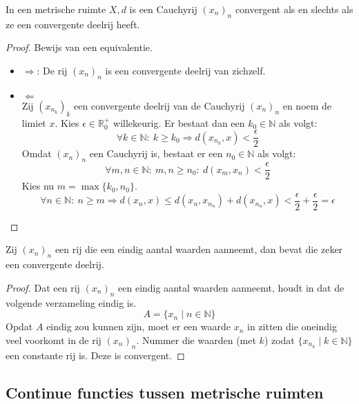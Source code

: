 \documentclass[main.tex]{subfiles}
\begin{document}
\begin{st}
  \label{st:cauchy-asa-convergente-deelrij}
  In een metrische ruimte $X,d$ is een Cauchyrij $(x_{n})_{n}$ convergent als en slechts als ze een convergente deelrij heeft. 

  \begin{proof}
    Bewijs van een equivalentie.
    \begin{itemize}
    \item $\Rightarrow$:
      De rij $(x_{n})_{n}$ is een convergente deelrij van zichzelf.
    \item $\Leftarrow$\\
      Zij $(x_{n_{k}})_{k}$ een convergente deelrij van de Cauchyrij $(x_{n})_{n}$ en noem de limiet $x$.
      Kies $\epsilon \in \mathbb{R}_{0}^{+}$ willekeurig.
      Er bestaat dan een $k_{0} \in \mathbb{N}$ als volgt:
      \[ \forall k\in \mathbb{N}:\ k \ge k_{0} \Rightarrow d(x_{n_{k}},x) < \frac{\epsilon}{2} \]
      Omdat $(x_{n})_{n}$ een Cauchyrij is, bestaat er een $n_{0} \in \mathbb{N}$ als volgt:
      \[ \forall m,n\in \mathbb{N}:\ m,n \ge n_{0}:\ d(x_{m},x_{n}) < \frac{\epsilon}{2} \]
      Kies nu $m = \max\{k_{0},n_{0}\}$.
      \[ \forall n\in \mathbb{N}:\ n \ge m \Rightarrow d(x_{n},x) \le d(x_{n},x_{n_{n}}) + d(x_{n_{n}},x) < \frac{\epsilon}{2} + \frac{\epsilon}{2} = \epsilon \]
    \end{itemize}
  \end{proof}
\end{st}

\begin{st}
  \label{st:rij-met-eindig-aantal-waarden-convergente-deelrij}
  Zij $(x_{n})_{n}$ een rij die een eindig aantal waarden aanneemt, dan bevat die zeker een convergente deelrij.

  \begin{proof}
    Dat een rij $(x_{n})_{n}$ een eindig aantal waarden aanneemt, houdt in dat de volgende verzameling eindig is.
    \[ A = \{ x_{n} \mid n \in \mathbb{N} \} \]
    Opdat $A$ eindig zou kunnen zijn, moet er een waarde $x_{n}$ in zitten die oneindig veel voorkomt in de rij $(x_{n})_{n}$.
    Nummer die waarden (met $k$) zodat $\{ x_{n_{k}} \mid k \in \mathbb{N} \}$ een constante rij is.
    Deze is convergent.\needed
  \end{proof}
\end{st}

\subsection{Continue functies tussen metrische ruimten}
\label{sec:cont-funct-tuss}
\end{document}
